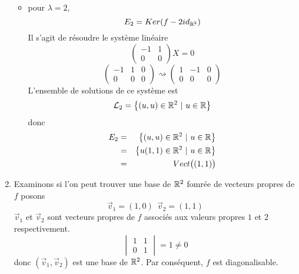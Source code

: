 \begin{enumerate}[(1)]
\begin{itemize}
      \item pour $\lambda = 2$,
        $$E_2 = Ker(f - 2 id_{\mathbb{R}^2})$$
        Il s'agit de résoudre le système linéaire
        $$\begin{pmatrix} -1 & 1 \\ 0 & 0 \end{pmatrix} X = 0$$
        $$\left( \begin{array}{cc|c} -1 & 1 & 0 \\ 0 & 0 & 0 \end{array} \right) \rightsquigarrow
          \left( \begin{array}{cc|c} 1 & -1 & 0 \\ 0 & 0 & 0 \end{array} \right)$$
        L'ensemble de solutions de ce système est
        $$\mathcal{L}_2 = \left\{(u, u) \in \mathbb{R}^2 ~ \vert ~ u \in \mathbb{R} \right\}$$
        donc 
        \begin{eqnarray*}
          E_2 &=& \left\{(u, u) \in \mathbb{R}^2 ~ \vert ~ u \in \mathbb{R} \right\} \\
            &=& \left\{u(1, 1) \in \mathbb{R}^2 ~ \vert ~ u \in \mathbb{R} \right\} \\
            &=& Vect\big((1, 1)\big)
        \end{eqnarray*}
    \end{itemize}
  
  \item Examinons si l'on peut trouver une base de $\mathbb{R}^2$ fomrée de vecteurs propres de $f$ posons
    $$\vec{v}_1 = (1, 0) ~ ~ \vec{v}_2 = (1, 1)$$
    $\vec{v}_1$ et $\vec{v}_2$ sont vecteurs propres de $f$ associés aux valeurs propres $1$ et $2$ respectivement.
    $$\begin{vmatrix} 1 & 1 \\ 0 & 1 \end{vmatrix} = 1 \neq 0$$
    donc $(\vec{v}_1, \vec{v}_2)$ est une base de $\mathbb{R}^2$. Par conséquent, $f$ est diagonalisable.
    

\end{enumerate}
